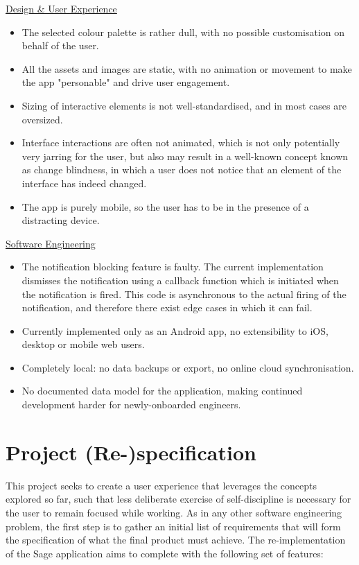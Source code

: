 \underline{Design \& User Experience}
\begin{itemize}
    \item The selected colour palette is rather dull, with no possible customisation on behalf of the user.
    \item All the assets and images are static, with no animation or movement to make the app "personable" and drive user engagement.
    \item Sizing of interactive elements is not well-standardised, and in most cases are oversized.
    \item Interface interactions are often not animated, which is not only potentially very jarring for the user, but also may result in a well-known concept known as change blindness, in which a user does not notice that an element of the interface has indeed changed.
    \item The app is purely mobile, so the user has to be in the presence of a distracting device.
\end{itemize}

\underline{Software Engineering}
\begin{itemize}
    \item The notification blocking feature is faulty. The current implementation dismisses the notification using a callback function which is initiated when the notification is fired. This code is asynchronous to the actual firing of the notification, and therefore there exist edge cases in which it can fail.
    \item Currently implemented only as an Android app, no extensibility to iOS, desktop or mobile web users.
    \item Completely local: no data backups or export, no online cloud synchronisation.
    \item No documented data model for the application, making continued development harder for newly-onboarded engineers.
\end{itemize}


\section{Project (Re-)specification}
This project seeks to create a user experience that leverages the concepts explored so far, such that less deliberate exercise of self-discipline is necessary for the user to remain focused while working. As in any other software engineering problem, the first step is to gather an initial list of requirements that will form the specification of what the final product must achieve. The re-implementation of the Sage application aims to complete with the following set of features:

